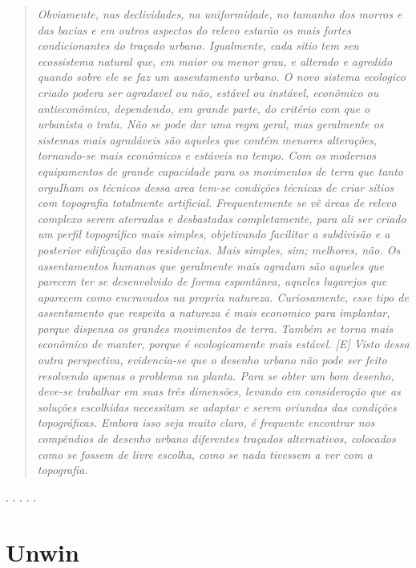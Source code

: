\documentclass[12pt, a4paper]{book} %
\begin{document}
            \begin{quotation} 
                \textit{Obviamente, nas declividades, na uniformidade, no tamanho dos morros e das bacias e em outros aspectos do relevo estarão os mais fortes condicionantes do traçado urbano.
                Igualmente, cada sitio tem seu ecossistema natural que, em maior ou menor grau, e alterado e agredido quando sobre ele se faz um assentamento urbano. O novo sistema ecologico criado podera ser agradavel ou não, estável ou instável, econômico ou antieconômico, dependendo, em grande parte, do critério com que o urbanista o trata.
                Não se pode dar uma regra geral, mas geralmente os sistemas mais agradáveis são aqueles que contém menores alterações, tornando-se mais econômicos e estáveis no tempo.
                Com os modernos equipamentos de grande capacidade para os movimentos de terra que tanto orguIham os técnicos dessa area tem-se condições técnicas de criar sítios com topografia totalmente artificial. Frequentemente se vê áreas de relevo complexo serem aterradas e desbastadas completamente, para ali ser criado um perfil topográfico mais simples, objetivando facilitar a subdivisão e a posterior edificação das residencias. Mais simples, sim; melhores, não. 
                Os assentamentos humanos que geralmente mais agradam são aqueles que parecem ter se desenvolvido de forma espontânea, aqueles lugarejos que aparecem como encravados na propria natureza. Curiosamente, esse tipo de assentamento que respeita a natureza é mais economico para implantar, porque dispensa os grandes movimentos de terra. Também se torna mais econômico de manter, porque é ecologicamente mais estável. 
                [E] Visto dessa outra perspectiva, evidencia-se que o desenho urbano não pode ser feito resolvendo apenas o problema na planta. Para se obter um bom desenho, deve-se trabalhar em suas três dimensões, levando em consideração que as soluções escolhidas necessitam se adaptar e serem oriundas das condições topográficas. 
                Embora isso seja muito claro, é frequente encontrar nos compêndios de desenho urbano diferentes traçados alternativos, colocados como se fossem de livre escolha, como se nada tivessem a ver com a topografia.}
            \end{quotation}

        \begin{center}
            . . . . .
        \end{center} 

\section{Unwin}
\end{document}
